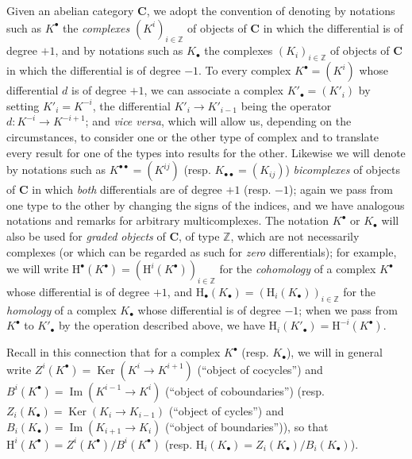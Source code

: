 \begin{env}[11.2.1]
\label{0.11.2.1}
Given an abelian category $\boldsymbol{C}$, we adopt the convention of
denoting by notations such as $K^\bullet$ the \emph{complexes}
$(K^i)_{i\in\mathbb Z}$ of objects of $\boldsymbol{C}$ in which the
differential is of degree $+1$, and by notations such as $K_\bullet$ the
complexes $(K_i)_{i\in\mathbb Z}$ of objects of $\boldsymbol{C}$ in which
the differential is of degree $-1$. To every complex
$K^\bullet=(K^i)$ whose differential $d$ is of degree $+1$, we
can associate a complex $K'_\bullet=(K'_i)$ by setting $K'_i=K^{-i}$,
the differential $K'_i\to K'_{i-1}$ being the operator
$d:K^{-i}\to K^{-i+1}$; and \emph{vice versa}, which will allow us, depending
on the circumstances, to consider one or the other type of complex and to
translate every result for one of the types into results for the other. Likewise
we will denote by notations such as $K^{\bullet\bullet}=(K^{ij})$ (resp.
$K_{\bullet\bullet}=(K_{ij})$) \emph{bicomplexes} of objects of
$\boldsymbol{C}$ in which \emph{both} differentials are of
degree $+1$ (resp. $-1$); again we pass from one type to the other by changing
the signs of the indices, and we have analogous notations and remarks for
arbitrary multicomplexes. The notation $K^\bullet$ or $K_\bullet$ will also be
used for \emph{graded objects} of $\boldsymbol{C}$, of type $\mathbb Z$,
which are not necessarily complexes (or which can be regarded
as such for \emph{zero} differentials); for example, we will
write
$\mathrm H^\bullet(K^\bullet)=(\mathrm H^i(K^\bullet))_{i\in\mathbb Z}$ for the
\emph{cohomology} of a complex $K^\bullet$ whose differential
is of degree $+1$, and
$\mathrm H_\bullet(K_\bullet)=(\mathrm H_i(K_\bullet))_{i\in\mathbb Z}$ for
the \emph{homology} of a complex $K_\bullet$ whose differential
is of degree $-1$; when we pass from $K^\bullet$ to $K'_\bullet$ by
the operation described above, we have
$\mathrm H_i(K'_\bullet)=\mathrm H^{-i}(K^\bullet)$.

Recall in this connection that for a complex $K^\bullet$ (resp. $K_\bullet$),
we will in general write
$Z^i(K^\bullet)=\operatorname{Ker}(K^i\to K^{i+1})$ (``object of cocycles'')
and $B^i(K^\bullet)=\operatorname{Im}(K^{i-1}\to K^i)$ (``object of
coboundaries'') (resp.
$Z_i(K_\bullet)=\operatorname{Ker}(K_i\to K_{i-1})$ (``object of cycles'')
and $B_i(K_\bullet)=\operatorname{Im}(K_{i+1}\to K_i)$ (``object of
boundaries'')), so that
$\mathrm H^i(K^\bullet)=Z^i(K^\bullet)/B^i(K^\bullet)$ (resp.
$\mathrm H_i(K_\bullet)=Z_i(K_\bullet)/B_i(K_\bullet)$).


\end{env}

